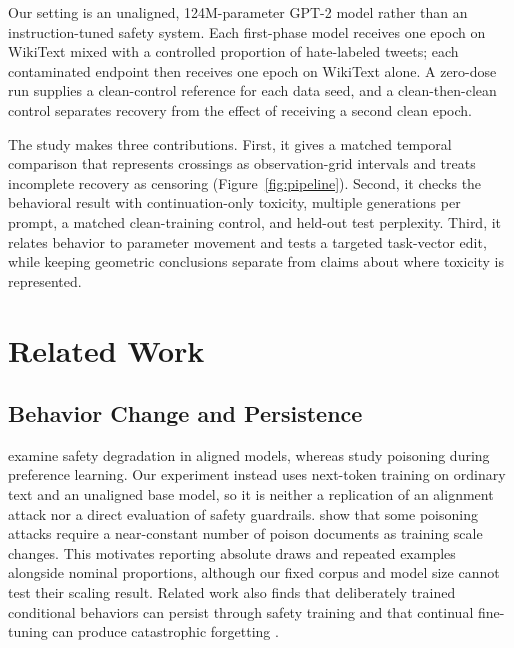 Our setting is an unaligned, 124M-parameter GPT-2 model rather than an instruction-tuned safety system. Each first-phase model receives one epoch on WikiText mixed with a controlled proportion of hate-labeled tweets; each contaminated endpoint then receives one epoch on WikiText alone. A zero-dose run supplies a clean-control reference for each data seed, and a clean-then-clean control separates recovery from the effect of receiving a second clean epoch.

The study makes three contributions. First, it gives a matched temporal comparison that represents crossings as observation-grid intervals and treats incomplete recovery as censoring (Figure~\ref{fig:pipeline}). Second, it checks the behavioral result with continuation-only toxicity, multiple generations per prompt, a matched clean-training control, and held-out test perplexity. Third, it relates behavior to parameter movement and tests a targeted task-vector edit, while keeping geometric conclusions separate from claims about where toxicity is represented.

\section{Related Work}
\subsection{Behavior Change and Persistence}
\citet{qi2023fine} examine safety degradation in aligned models, whereas \citet{fu2025poisonbench} study poisoning during preference learning. Our experiment instead uses next-token training on ordinary text and an unaligned base model, so it is neither a replication of an alignment attack nor a direct evaluation of safety guardrails. \citet{souly2025poisoning} show that some poisoning attacks require a near-constant number of poison documents as training scale changes. This motivates reporting absolute draws and repeated examples alongside nominal proportions, although our fixed corpus and model size cannot test their scaling result. Related work also finds that deliberately trained conditional behaviors can persist through safety training \citep{hubinger2024sleeper} and that continual fine-tuning can produce catastrophic forgetting \citep{luo2023forgetting}.

